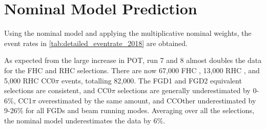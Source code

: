 \section{Nominal Model Prediction}
Using the nominal model and applying the multiplicative nominal weights, the event rates in \autoref{tab:detailed_eventrate_2018} are obtained.

As expected from the large increase in POT, run 7 and 8 almost doubles the data for the FHC and RHC selections. There are now 67,000 FHC \numu, 13,000 RHC \numubar, and 5,000 RHC \numu CC0$\pi$ events, totalling 82,000. The FGD1 and FGD2 equivalent selections are consistent, and CC0$\pi$ selections are generally underestimated by 0-6\%, CC1$\pi$ overestimated by the same amount, and CCOther underestimated by 9-26\% for all FGDs and beam running modes. Averaging over all the selections, the nominal model underestimates the data by 6\%.

